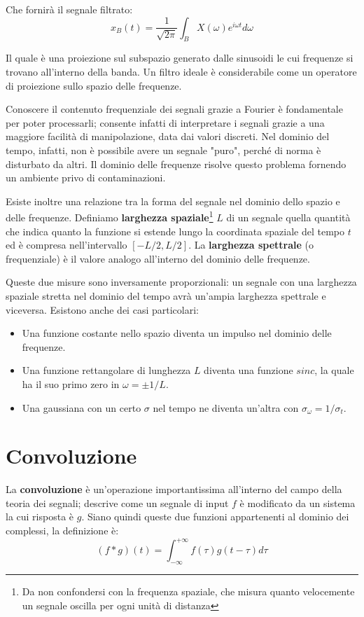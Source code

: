 \noindent Che fornirà il segnale filtrato: \[
    x_B(t) = \frac{1}{\sqrt{2\pi}}\int_B X(\omega)e^{i\omega t}d\omega
\]

\noindent Il quale è una proiezione sul subspazio generato dalle sinusoidi le cui frequenze si trovano all'interno della banda. Un filtro ideale è
considerabile come un operatore di proiezione sullo spazio delle frequenze.\par
Conoscere il contenuto frequenziale dei segnali grazie a Fourier è fondamentale per poter processarli; consente infatti di interpretare i segnali grazie
a una maggiore facilità di manipolazione, data dai valori discreti. Nel dominio del tempo, infatti, non è possibile avere un segnale "puro", perché di
norma è disturbato da altri. Il dominio delle frequenze risolve questo problema fornendo un ambiente privo di contaminazioni.\par
Esiste inoltre una relazione tra la forma del segnale nel dominio dello spazio e delle frequenze. Definiamo \textbf{larghezza spaziale}\footnote{Da non
confondersi con la frequenza spaziale, che misura quanto velocemente un segnale oscilla per ogni unità di distanza} $L$ di un segnale quella quantità
che indica quanto la funzione si estende lungo la coordinata spaziale del tempo $t$ ed è compresa nell'intervallo $[-L/2, L/2]$. La \textbf{larghezza
spettrale} (o frequenziale) è il valore analogo all'interno del dominio delle frequenze.\par
Queste due misure sono inversamente proporzionali: un segnale con una larghezza spaziale stretta nel dominio del tempo avrà un'ampia larghezza spettrale
e viceversa. Esistono anche dei casi particolari: \begin{itemize}
    \item Una funzione costante nello spazio diventa un impulso nel dominio delle frequenze.
    \item Una funzione rettangolare di lunghezza $L$ diventa una funzione $sinc$, la quale ha il suo primo zero in $\omega = \pm 1/L$.
    \item Una gaussiana con un certo $\sigma$ nel tempo ne diventa un'altra con $\sigma_\omega = 1/\sigma_t$.
\end{itemize}

%

\section{Convoluzione}
La \textbf{convoluzione} è un'operazione importantissima all'interno del campo della teoria dei segnali; descrive come un segnale di input $f$ è
modificato da un sistema la cui risposta è $g$. Siano quindi queste due funzioni appartenenti al dominio dei complessi, la definizione è: \[
    (f*g)(t) = \int_{-\infty}^{+\infty} f(\tau)g(t-\tau) d\tau
\]


